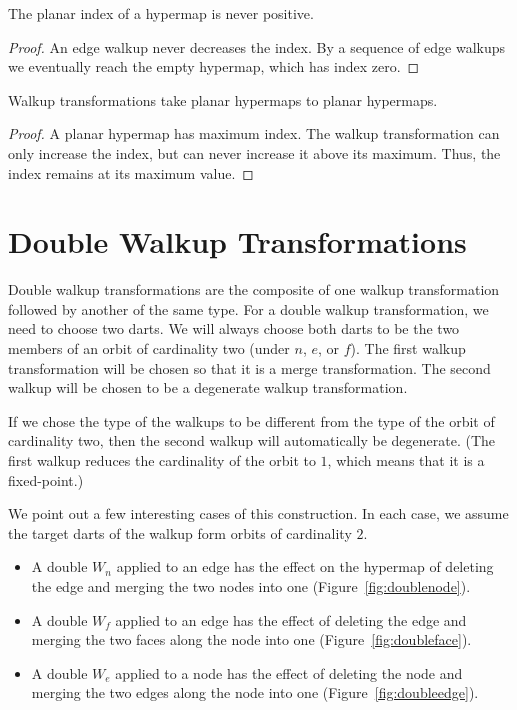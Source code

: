 \begin{lemma}  The planar index
of a hypermap is never positive.
\end{lemma}

\begin{proof}  An edge walkup never decreases the index.  By a sequence
of edge walkups we eventually reach the empty hypermap, which has
index zero.
\end{proof}


\begin{lemma} Walkup transformations take planar hypermaps to planar
hypermaps.
\end{lemma}

\begin{proof}  
A planar hypermap has maximum index.  The walkup
transformation can only increase the index, but can never increase
it above its maximum.  Thus, the index remains at its maximum value.
\end{proof}


\section{Double Walkup Transformations}

Double walkup transformations are the composite of one walkup
transformation followed by another of the same type.  For a double
walkup transformation, we need to choose two darts.  We will always
choose both darts to be the two members of an orbit of cardinality
two (under $n$, $e$, or $f$).  The first walkup transformation will be
chosen so that it is a merge transformation.  The second walkup will
be chosen to be a degenerate walkup transformation.

If we chose the type of the walkups to be different from the type of
the orbit of cardinality two, then the second walkup will
automatically be degenerate.  (The first walkup reduces the
cardinality of the orbit to $1$, which means that it is a
fixed-point.)

We point out a few interesting cases of this construction. In each
case, we assume the target darts of the walkup form orbits of
cardinality $2$.
\begin{itemize}
    \item A double $W_n$ applied to an edge has the effect on
    the hypermap of deleting the edge and merging the two nodes into
    one (Figure~\ref{fig:doublenode}). 
    \item A double $W_f$ applied to an edge has the effect of
    deleting the edge and merging the two faces along the node into
    one (Figure~\ref{fig:doubleface}).
    \item A double $W_e$ applied to a node has the effect of
    deleting the node and merging the two edges along the node into
    one (Figure~\ref{fig:doubleedge}).
\end{itemize}


